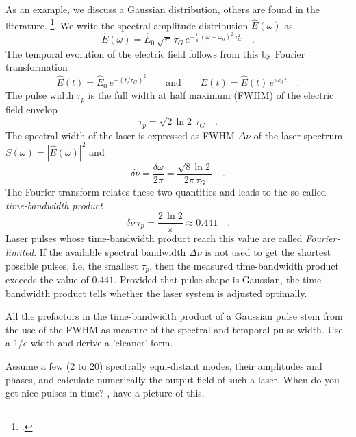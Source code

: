 As an example, we discuss a Gaussian distribution, others are found in the literature. \footcite{DielsRudolph1996,Rulliere2005}.
We write the spectral amplitude distribution $\hat{E}(\omega)$ as
\begin{equation}
  \hat{E}(\omega) = \hat{E}_0 \, \sqrt{\pi} \, \tau_G \, e^{-
  \frac{1}{4} \, (\omega - \omega_0)^2 \, \tau_G^2} \quad .
\end{equation}
The temporal evolution of the electric field follows from this by
Fourier transformation
\begin{equation}
  \hat {E}(t) = \hat{E}_0 \, e^{- ( t / \tau_G ) ^2}
  \qquad\text{and}\qquad E(t) = \hat{E}(t)\, e^{i \omega_0 \, t} \quad .
\end{equation}
The pulse width $\tau_p$ is the full width at half maximum (FWHM) of the electric field envelop
\begin{equation}
  \tau_p = \sqrt{2 \, \ln 2} \, \tau_G \quad.
\end{equation}
The spectral width of the laser is expressed as FWHM $\Delta
\nu$ of the laser spectrum $S(\omega) =
|\hat{E}(\omega)|^2$ and
\begin{equation}
  \delta \nu = \frac{\delta \omega}{2 \pi} = \frac{\sqrt{8 \, \ln
  2}}{2 \pi \, \tau_G} \quad.
\end{equation}
The Fourier transform relates these two quantities and leads to the so-called \emph{time-bandwidth product}
\begin{equation}
  \delta \nu \, \tau_p = \frac{2 \, \ln 2}{\pi} \approx 0.441 \quad .
\end{equation}
Laser pulses whose time-bandwidth product reach this value
are called \emph{Fourier-limited}. If the available
 spectral bandwidth $\Delta \nu$ is not used
to get the shortest possible pulses, i.e. the smallest $\tau_p$,
then the measured time-bandwidth product exceeds the
value of $0.441$. Provided that pulse shape is Gaussian, the time-bandwidth product tells whether the 
laser system is adjusted optimally.

\begin{questions}
\item All the prefactors in the time-bandwidth product of a Gaussian pulse stem from the use of the FWHM as measure of the spectral and temporal pulse width. Use a $1/e$ width and derive a 'cleaner' form.

\item Assume a few (2 to  20) spectrally equi-distant modes, their amplitudes and phases, and calculate numerically the output field of such a laser. When do you get nice pulses in time? \cite{DielsRudolph1996}, have a picture of this.

\end{questions}



